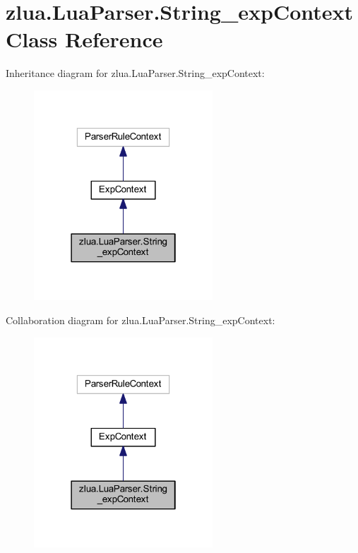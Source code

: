 \hypertarget{classzlua_1_1_lua_parser_1_1_string__exp_context}{}\section{zlua.\+Lua\+Parser.\+String\+\_\+exp\+Context Class Reference}
\label{classzlua_1_1_lua_parser_1_1_string__exp_context}


Inheritance diagram for zlua.\+Lua\+Parser.\+String\+\_\+exp\+Context\+:
\nopagebreak
\begin{figure}[H]
\begin{center}
\leavevmode
\includegraphics[width=190pt]{classzlua_1_1_lua_parser_1_1_string__exp_context__inherit__graph}
\end{center}
\end{figure}


Collaboration diagram for zlua.\+Lua\+Parser.\+String\+\_\+exp\+Context\+:
\nopagebreak
\begin{figure}[H]
\begin{center}
\leavevmode
\includegraphics[width=190pt]{classzlua_1_1_lua_parser_1_1_string__exp_context__coll__graph}
\end{center}
\end{figure}

